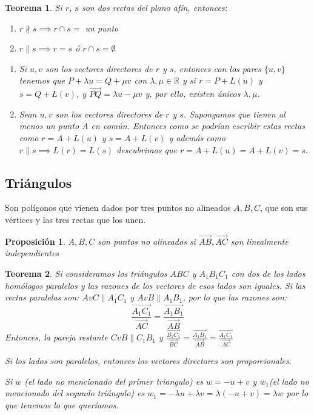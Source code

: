 \documentclass[11pt, a4paper, titlepage]{article}
\makeatletter
\renewenvironment{proof}[1][\proofname] {\vspace{-15pt}\par\pushQED{\qed}\normalfont\topsep6\p@\@plus6\p@\relax\trivlist\item[\hskip\labelsep\it#1\@addpunct{.}]\ignorespaces}{\popQED\endtrivlist\@endpefalse}
\newcommand{\R}{\mathbb{R}}
\theoremstyle{theorem-style}
\newtheorem*{nth}{Teorema}
\newtheorem*{nprop}{Proposición}
\theoremstyle{definition-style}
\theoremstyle{remark-style}
\theoremstyle{example-style}
\newenvironment{nlist}
{\begin{enumerate}
\renewcommand\labelenumi{(\emph{\roman{enumi})}}}
{\end{enumerate}}
\makeatother
\begin{document}
\begin{nth}
	Si $r$, $s$ son dos rectas del plano afín, entonces:
	\begin{nlist}
	\item $r \nparallel s\implies r \cap s = $ un punto
	\item $r \parallel s \implies r = s$ ó $r \cap s =  \emptyset$
\end{nlist}
\begin{proof}
	\begin{nlist}
	\item Si $u,v$ son los vectores directores de $r$ y $s$, entonces con los pares $\{u,v\}$ tenemos que $P+\lambda u = Q + \mu v$ con $\lambda, \mu \in \R$
y si $r = P +L(u)$ y $s=Q+L(v)$, y $\overrightarrow{PQ} = \lambda u - \mu v $ y, por ello, existen únicos $\lambda, \mu$.
\item Sean $u,v$ son los vectores directores de $r$ y $s$. Supongamos que tienen al menos un punto  A en común. Entonces como se podrían escribir estas rectas como $r = A +L(u)$ y $s=A+L(v)$ y además como $r \parallel s \implies L(r)=L(s)$ descubrimos que $r = A +L(u)=A+L(v) = s$.
\end{nlist}
\end{proof}
\end{nth}

\subsection{Triángulos}
Son polígonos que vienen dados por tres puntos no alineados $A,B,C$, que son sus vértices y las tres rectas que los unen.

\begin{nprop}
$A,B,C$ son puntos no alineados si $\vec{AB},\vec{AC}$ son linealmente independientes
\end{nprop}


\begin{nth}
	Si consideramos los triángulos $ABC$ y $A_1B_1C_1$ con dos de los lados homólogos paralelos y las razones de los vectores de esos lados son iguales. 
	Si las rectas paralelas son: $AvC \parallel A_1C_1$ y $AvB \parallel A_1B_1$, por lo que las razones son:
	\[
	\frac{\vec{A_1C_1}}{\vec{AC}} = \frac{\vec{A_1B_1}}{\vec{AB}}
	\]
	Entonces, la pareja restante $CvB \parallel C_1B_1$ y $\frac{\vec{B_1C_1}}{\vec{BC}} = \frac{\vec{A_1B_1}}{\vec{AB}} = \frac{\vec{A_1C_1}}{\vec{AC}}$\\
	\begin{proof}
	Si los lados son paralelos, entonces los vectores directores son proporcionales.
	
	Si $w$ (el lado no mencionado del primer triangulo) es $w=-u+v$ y $w_1$(el lado no mencionado del segundo triángulo) es $w_1 = - \lambda u + \lambda v = \lambda (-u+v) = \lambda w$  por lo que tenemos lo que queríamos.
\end{proof}
\end{nth}
 
\end{document}
